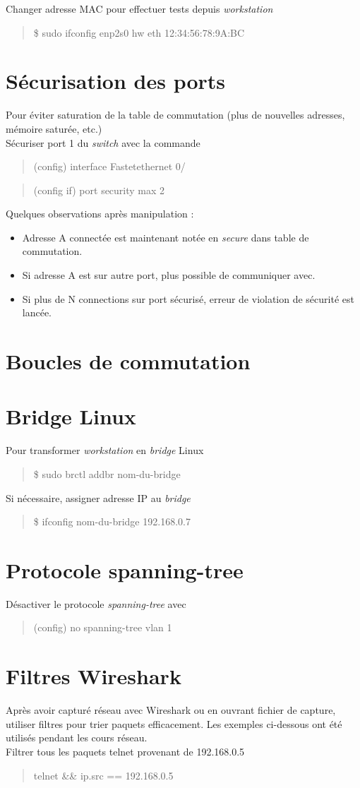 \documentclass[a4paper, 11pt]{article}
\newcommand{\commande}[1] {
    \begin{quote}
    \tt\raggedright #1
    \end{quote}
}
\begin{document}
Changer adresse MAC pour effectuer tests depuis \textit{workstation} 
    
\commande{\$ sudo ifconfig enp2s0 hw eth 12:34:56:78:9A:BC}

\section{Sécurisation des ports}

Pour éviter saturation de la table de commutation (plus de nouvelles adresses, mémoire saturée, etc.)
\\

Sécuriser port 1 du \textit{switch} avec la commande

\commande{(config) interface Fastetethernet 0/}
\commande{(config if) port security max 2}

Quelques observations après manipulation :

\begin{itemize}
\item Adresse A connectée est maintenant notée en \textit{secure} dans table de commutation.
\item Si adresse A est sur autre port, plus possible de communiquer avec.
\item Si plus de N connections sur port sécurisé, erreur de violation de sécurité est lancée.
\end{itemize}

\section{Boucles de commutation}

\section{Bridge Linux}

Pour transformer \textit{workstation} en \textit{bridge} Linux

\commande{\$ sudo brctl addbr nom-du-bridge}

Si nécessaire, assigner adresse IP au \textit{bridge}

\commande{\$ ifconfig nom-du-bridge 192.168.0.7}

\section{Protocole spanning-tree}

Désactiver le protocole \textit{spanning-tree} avec 

\commande{(config) no spanning-tree vlan 1}

\section{Filtres Wireshark}

Après avoir capturé réseau avec Wireshark ou en ouvrant fichier de capture, utiliser filtres pour trier paquets efficacement. Les exemples ci-dessous ont été utilisés pendant les cours réseau.
\\

Filtrer tous les paquets telnet provenant de 192.168.0.5

\commande{telnet \&\& ip.src == 192.168.0.5}
\end{document}
